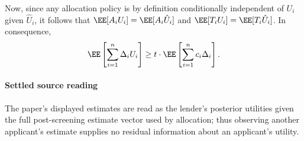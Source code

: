 \documentclass[10pt]{article}
\begin{document}
\begin{ReviewVerbatim}

Now, since any allocation policy is by definition conditionally independent of \(U_i\) given \(\hat U_i\), it follows that \(\EE [A_i U_i] = \EE [A_i \hat U_i]\) and \(\EE [T_i U_i] = \EE [T_i \hat U_i]\). In consequence,
\begin{equation}
    \label{eq:key}
        \EE \left[ \sum_{i = 1}^n \Delta_i U_i \right] \geq t \cdot \EE \left[ \sum_{i = 1}^n c_i \Delta_i \right].
    \end{equation}
\end{ReviewVerbatim}

\paragraph{Settled source reading}
\begin{sloppypar}
The paper's displayed estimates are read as the lender's posterior utilities given the full post-\allowbreak{}screening estimate vector used by allocation;\allowbreak{} thus observing another applicant's estimate supplies no residual information about an applicant's utility.\allowbreak{}
\end{sloppypar}
\end{document}

